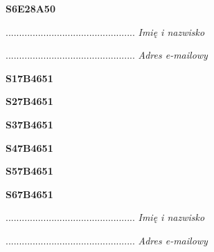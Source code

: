 \begin{turn}{90}\huge \textbf{S6E28A50}\end{turn}

\begin{turn}{90}\begin{minipage}{\linewidth} \vspace{20mm} ................................................  \textit{Imię i nazwisko}\end{minipage}\end{turn}

\begin{turn}{90}\begin{minipage}{\linewidth} \vspace{20mm} ................................................  \textit{Adres e-mailowy}\end{minipage}\end{turn}

\begin{turn}{90}\huge \textbf{S17B4651}\end{turn}

\begin{turn}{90}\huge \textbf{S27B4651}\end{turn}

\begin{turn}{90}\huge \textbf{S37B4651}\end{turn}

\begin{turn}{90}\huge \textbf{S47B4651}\end{turn}

\begin{turn}{90}\huge \textbf{S57B4651}\end{turn}

\begin{turn}{90}\huge \textbf{S67B4651}\end{turn}

\begin{turn}{90}\begin{minipage}{\linewidth} \vspace{20mm} ................................................  \textit{Imię i nazwisko}\end{minipage}\end{turn}

\begin{turn}{90}\begin{minipage}{\linewidth} \vspace{20mm} ................................................  \textit{Adres e-mailowy}\end{minipage}\end{turn}

